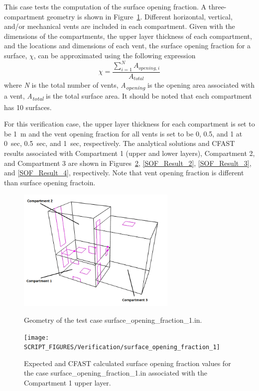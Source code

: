 This case tests the computation of the surface opening fraction. A three-compartment geometry is shown in Figure~\ref{SOF_GEO}. Different horizontal, vertical, and/or mechanical vents are included in each compartment. Given with the dimensions of the compartments, the upper layer thickness of each compartment, and the locations and dimensions of each vent, the surface opening fraction for a surface, $\chi$, can be approximated using the following expression
\begin{equation}
\chi = \frac{\sum_{i=1}^N A_{opening,i}} {A_{total}}
\end{equation}
where \textit{N} is the total number of vents, \textit{A\textsubscript{opening}} is the opening area associated with a vent, \textit{A\textsubscript{total}} is the total surface area. It should be noted that each compartment has 10 surfaces.

For this verification case, the upper layer thickness for each compartment is set to be 1~m and the vent opening fraction for all vents is set to be 0, 0.5, and 1 at  0~sec, 0.5~sec, and 1~sec, respectively. The analytical solutions and CFAST results associated with Compartment 1 (upper and lower layers), Compartment 2, and Compartment 3 are shown in Figures~\ref{SOF_Result_1}, \ref{SOF_Result_2}, \ref{SOF_Result_3}, and \ref{SOF_Result_4}, respectively. Note that vent opening fraction is different than surface opening fractoin.

\begin{figure}[!ht]
\centering
\includegraphics[width=3.0in]{FIGURES/Verification/surface_opening_fraction_1} \\
\caption[Geometry of the test case {\ct surface\_opening\_fraction\_1.in}]{Geometry of the test case {\ct surface\_opening\_fraction\_1.in}.}
\label{SOF_GEO}
\end{figure}

\begin{figure}[!ht]
\centering
\texttt{[image: SCRIPT\_FIGURES/Verification/surface\_opening\_fraction\_1]}
\caption[Results of the test case {\ct surface\_opening\_fraction\_1.in}]{Expected and CFAST calculated surface opening fraction values for the case {\ct surface\_opening\_fraction\_1.in} associated with the Compartment 1 upper layer.}
\label{SOF_Result_1}
\end{figure}

